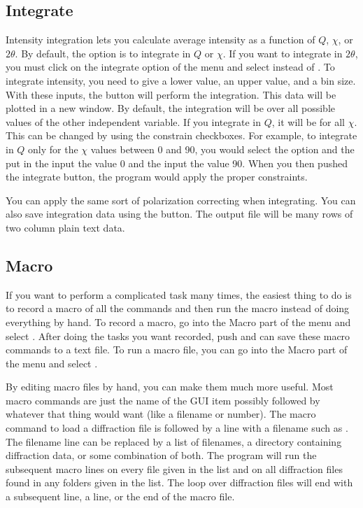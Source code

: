 \subsection{Integrate}
Intensity integration lets you calculate average intensity
as a function of $Q$, $\chi$, or $2\theta$. By default, the
option is to integrate in $Q$ or $\chi$. If you want to 
integrate in $2\theta$, you must click on the integrate 
option of the menu and select  instead
of . To integrate intensity, you need to
give a lower value, an upper value, and a bin size. With 
these inputs, the  button will perform the
integration. This data will be plotted in a new window.
By default, the integration will be over all possible values
of the other independent variable. If you integrate in $Q$,
it will be for all $\chi$. This can be changed by using the
constrain checkboxes. For example, to integrate in $Q$ only
for the $\chi$ values between 0 and 90, you would select the
 option and the put in
the  input the value 0 and the 
input the value 90.  When you then pushed the integrate button, 
the program would apply the proper constraints.

You can apply the same sort of polarization correcting when 
integrating. You can also save integration data using the
 button. The output file will be many rows
of two column plain text data. 

\subsection{Macro}
If you want to perform a complicated task many times, the
easiest thing to do is to record a macro of all the commands
and then run the macro instead of doing everything by hand.
To record a macro, go into the Macro part of the menu and
select . After doing the tasks you
want recorded, push  and can save 
these macro commands to a text file. To run a macro file,
you can go into the Macro part of the menu and select
. 

By editing macro files by hand, you can make them much more
useful. Most macro commands are just the name of the GUI item
possibly followed by whatever that thing would want (like a 
filename or number). The macro command to load a diffraction 
file is  followed by a line with a
filename such as .
The filename line can be replaced by a list of filenames,
a directory containing diffraction data, or some combination
of both. The program will run the subsequent macro lines on
every file given in the list and on all diffraction files found 
in any folders given in the list. The loop over diffraction
files will end with a subsequent  line,
a  line, or the end of the macro file.

